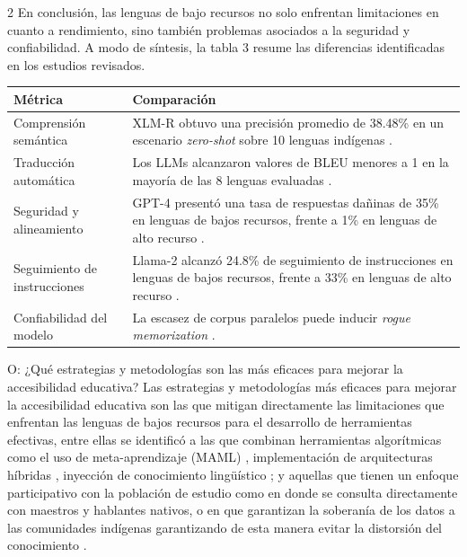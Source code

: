 \documentclass[12pt,twoside,titlepage]{ingenius}
\begin{document}
\begin{multicols}{2}
En conclusión, las lenguas de bajo recursos no solo enfrentan limitaciones en cuanto a rendimiento, sino también problemas asociados a la seguridad y confiabilidad. A modo de síntesis, la tabla 3 resume las diferencias identificadas en los estudios revisados.

\begin{table}[H]
\centering
{}
\small
    \begin{tabular}{p{2.2cm}p{4.8cm}}
    \toprule
    \textbf{Métrica} & \textbf{Comparación} \\
    \midrule
    Comprensión semántica & XLM-R obtuvo una precisión promedio de 38.48\% en un escenario \textit{zero-shot} sobre 10 lenguas indígenas \cite{Ebrahimi2022}. \\ \addlinespace

    Traducción automática & Los LLMs alcanzaron valores de BLEU menores a 1 en la mayoría de las 8 lenguas evaluadas \cite{Zhang2024}. \\ \addlinespace

    Seguridad y alineamiento & GPT-4 presentó una tasa de respuestas dañinas de 35\% en lenguas de bajos recursos, frente a 1\% en lenguas de alto recurso \cite{Shen2024}. \\ \addlinespace

    Seguimiento de instrucciones & Llama-2 alcanzó 24.8\% de seguimiento de instrucciones en lenguas de bajos recursos, frente a 33\% en lenguas de alto recurso \cite{Shen2024}. \\ \addlinespace

    Confiabilidad del modelo & La escasez de corpus paralelos puede inducir \textit{rogue memorization} \cite{Cavalin2024}. \\
    \bottomrule
    \end{tabular}
\label{tab:brechas_ia_lenguas}
\end{table}


O: ¿Qué estrategias y metodologías son las más eficaces para mejorar la accesibilidad educativa?
Las estrategias y metodologías más eficaces para mejorar la accesibilidad educativa son las que mitigan directamente las limitaciones que enfrentan las lenguas de bajos recursos para el desarrollo de herramientas efectivas, entre ellas se identificó a las que combinan herramientas algorítmicas como el uso de meta-aprendizaje (MAML) \cite{Fakhreldin2025}, implementación de arquitecturas híbridas \cite{Chang2025}, inyección de conocimiento lingüístico \cite{Zhang2024}; y aquellas que tienen un enfoque participativo con la población de estudio como en \cite{Liu2022} donde se consulta directamente con maestros y hablantes nativos, o en \cite{Mager2023} que garantizan la soberanía de los datos a las comunidades indígenas garantizando de esta manera evitar la distorsión del conocimiento \cite{Rathnayake2026}.


\end{multicols}
\end{document}

